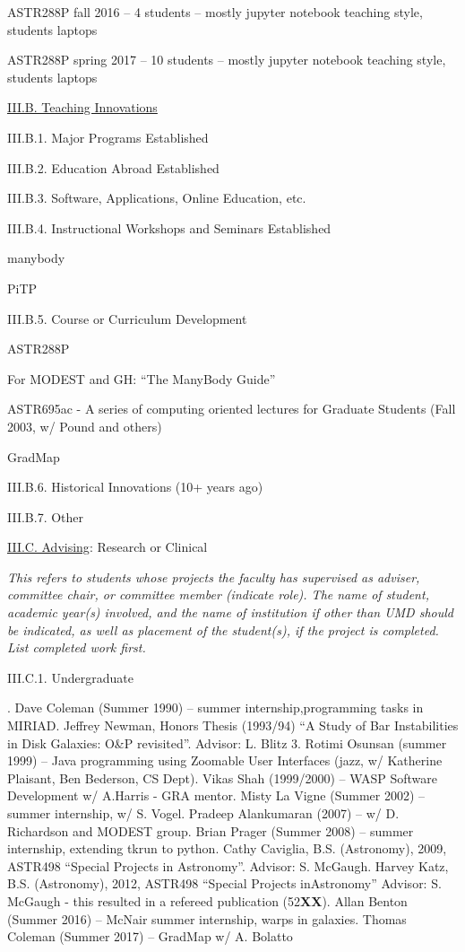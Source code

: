 \documentclass[11pt,letterpaper]{article}
\newcommand{\newi}{\newline\indent}
\begin{document}
ASTR288P fall 2016 --  4 students -- mostly jupyter notebook teaching style, students laptops

ASTR288P spring 2017 -- 10 students -- mostly jupyter notebook teaching style, students laptops


\underline{III.B. Teaching Innovations}

III.B.1. Major Programs Established

III.B.2. Education Abroad Established
 
III.B.3. Software, Applications, Online Education, etc.

III.B.4. Instructional Workshops and Seminars Established

manybody

PiTP

III.B.5. Course or Curriculum Development

ASTR288P

For MODEST and GH: ``The ManyBody Guide''

ASTR695ac - A series of computing oriented lectures for Graduate Students (Fall 2003, w/ Pound and others)

GradMap 



III.B.6. Historical Innovations (10+ years ago)

III.B.7. Other


\underline{III.C. Advising}: Research or Clinical

\textit{This refers to students whose projects the faculty has supervised as adviser, committee chair, or committee member (indicate role). The name of student, academic year(s) involved, and the name of institution if other than UMD should be indicated, as well as placement of the student(s), if the project is completed.  List completed work first.}

III.C.1. Undergraduate

. Dave Coleman (Summer 1990) -- summer internship,programming tasks in MIRIAD\newi
2. Jeffrey Newman, Honors Thesis (1993/94) ``A Study of Bar Instabilities in Disk Galaxies: O\&P revisited''. Advisor: L. Blitz
3. Rotimi Osunsan (summer 1999) -- Java programming using Zoomable User Interfaces (jazz, w/ Katherine Plaisant, Ben Bederson, CS Dept)\newi
4. Vikas Shah (1999/2000) -- WASP Software Development w/ A.Harris - GRA mentor\newi
5. Misty La Vigne (Summer 2002) -- summer internship, w/ S. Vogel\newi
6. Pradeep Alankumaran (2007) -- w/ D. Richardson and MODEST group\newi
7. Brian Prager (Summer 2008) -- summer internship, extending tkrun to python\newi
8. Cathy Caviglia, B.S. (Astronomy), 2009,  ASTR498 ``Special Projects in Astronomy''.  Advisor:  S. McGaugh\newi
9. Harvey Katz, B.S. (Astronomy), 2012,  ASTR498  ``Special Projects inAstronomy''
 Advisor:  S. McGaugh -  this resulted in a refereed publication (52{\bf XX})\newi
10. Allan Benton (Summer 2016) -- McNair summer internship, warps in galaxies\newi
11. Thomas Coleman (Summer 2017) -- GradMap w/ A. Bolatto\newi
\end{document}
